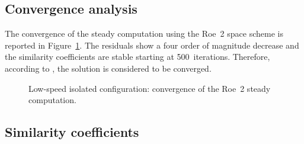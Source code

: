 
\subsection{Convergence analysis}
\label{sub:dream_ls_conv_coeff}

The convergence of the steady computation using the Roe~2 space scheme
is reported in Figure~\ref{fig:dream_ls_convergence_roe2}. The residuals
show a four order of magnitude decrease and the similarity
coefficients are stable starting at 500~iterations.
Therefore, according to \citet{Casey2000}, the
solution is considered to be converged.
\begin{figure}[htp]
  \centering
  \caption{Low-speed isolated configuration: convergence of the Roe~2 steady
  computation.}
  \label{fig:dream_ls_convergence_roe2}
\end{figure}

\subsection{Similarity coefficients}
\label{sub:dream_ls_sim_coeff}

